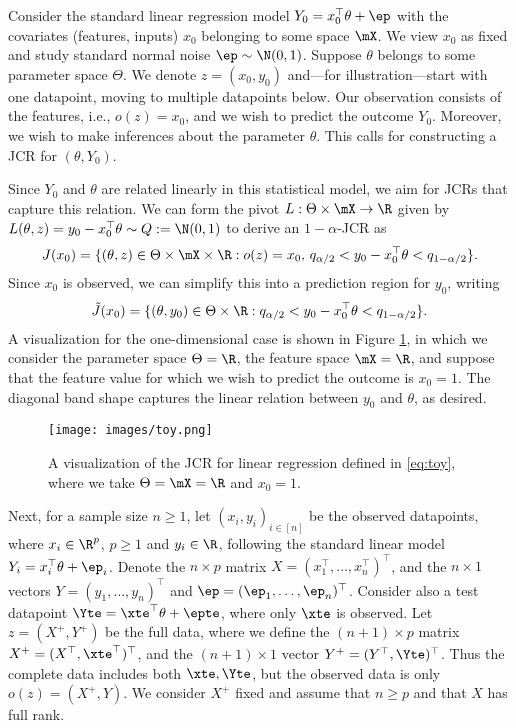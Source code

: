\documentclass[english]{article}
\begin{document}
\begin{example}\label{example:lr-pivot}
Consider the standard linear regression model $Y_0 = x_0^\top \theta + \ep$ with 
the covariates (features, inputs) $x_0$ belonging to some space $\mX$.
We view $x_0$ as fixed
and study standard normal
noise $\ep \sim \N(0,1)$. 
Suppose $\theta$ belongs to some parameter space $\Theta$.
We denote $z=(x_0,y_0)$ and---for illustration---start with one datapoint, moving to multiple datapoints below.
Our observation consists of the features, i.e.,  $o(z) = x_0$, and we wish to predict the outcome $Y_0$.
Moreover, we wish to make inferences about the parameter $\theta$. 
This calls for constructing a JCR for $(\theta,Y_0)$. 

Since $Y_0$ and $\theta$ are related linearly in this statistical model, we aim for JCRs that capture this relation.
We can form the pivot 
$L:\Theta\times\mX\to \R$ given by
$ L(\theta,z) = y_0 - x_0^\top\theta \sim Q := \N(0,1)$ to derive an 
$1-\alpha$-JCR as
\begin{align*}
    J(x_0)=\{ (\theta,z) \in \Theta\times \mX\times \R: o(z)=x_0,\,  q_{\alpha/2} < y_0 - x_0^\top \theta < q_{1 - \alpha/2}  \}.
\end{align*}
Since $x_0$ is observed, we can simplify this into a prediction region for $y_0$, writing 
\begin{align}\label{eq:toy}
    \tilde J(x_0)=\{ (\theta,y_0)\in \Theta\times  \R: q_{\alpha/2} < y_0 - x_0^\top \theta < q_{1 - \alpha/2}  \}.
\end{align}
A  visualization for the one-dimensional case is shown in Figure \ref{fig:toy}, in which we consider the parameter space $\Theta = \R$, the feature space $\mX = \R$, and suppose that the feature value for which we wish to predict the outcome is $x_0 = 1$.
The diagonal band shape captures the linear relation between $y_0$ and $\theta$, as desired.
\begin{figure}[ht]
    \centering
    \texttt{[image: images/toy.png]}
    \caption{A visualization of the JCR for linear regression defined in \eqref{eq:toy}, where we take $\Theta = \mX = \R$ and $x_0 = 1$.}
    \label{fig:toy}
\end{figure}

Next, 
for a sample size $n\ge 1$,
let $(x_i,y_i)_{i\in [n]}$ be the observed datapoints, where $x_i\in \R^{p}$, $p\ge 1$ and $y_i\in\R$, following the standard linear model 
$Y_i = x_i^\top\theta + \ep_i$. 
Denote 
the $n\times p$ matrix
$X = (x_1^\top,\ldots,x_n^\top)^\top$,
and the $n\times 1$ vectors
$Y = (y_1,\ldots,y_n)^\top$
and $\ep = (\ep_1,\ldots,\ep_n)^\top$.
Consider also a test datapoint $\Yte = \xte^\top \theta + \epte$, where only $\xte$ is observed. 
Let $z = (X^+,Y^+)$ be the full data, where we define
the $(n+1)\times p$ matrix
$X^+ = (X^\top,\xte^\top)^\top$,
and the $(n+1)\times 1$ vector
$Y^+=(Y^\top,\Yte)^\top$.
Thus the complete data includes both $\xte,\Yte$, but the observed data is only
$o(z)=(X^+,Y)$.
We consider $X^+$ fixed and assume that $n\ge p$ and that $X$ has full rank.


\end{example}
\end{document}

